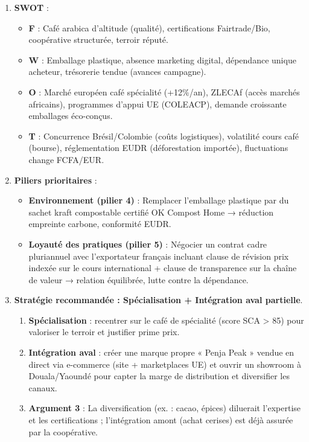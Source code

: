 \documentclass[11pt]{article}
\begin{document}
\begin{corrige}
\begin{enumerate}
    \item \textbf{SWOT} :
    \begin{itemize}
        \item \textbf{F} : Café arabica d'altitude (qualité), certifications Fairtrade/Bio, coopérative structurée, terroir réputé.
        \item \textbf{W} : Emballage plastique, absence marketing digital, dépendance unique acheteur, trésorerie tendue (avances campagne).
        \item \textbf{O} : Marché européen café spécialité (+12\%/an), ZLECAf (accès marchés africains), programmes d'appui UE (COLEACP), demande croissante emballages éco-conçus.
        \item \textbf{T} : Concurrence Brésil/Colombie (coûts logistiques), volatilité cours café (bourse), réglementation EUDR (déforestation importée), fluctuations change FCFA/EUR.
    \end{itemize}
    \item \textbf{Piliers prioritaires} :
    \begin{itemize}
        \item \textbf{Environnement (pilier 4)} : Remplacer l'emballage plastique par du sachet kraft compostable certifié OK Compost Home → réduction empreinte carbone, conformité EUDR.
        \item \textbf{Loyauté des pratiques (pilier 5)} : Négocier un contrat cadre pluriannuel avec l'exportateur français incluant clause de révision prix indexée sur le cours international + clause de transparence sur la chaîne de valeur → relation équilibrée, lutte contre la dépendance.
    \end{itemize}
    \item \textbf{Stratégie recommandée : Spécialisation + Intégration aval partielle}.
    \begin{enumerate}
        \item \textbf{Spécialisation} : recentrer sur le café de spécialité (score SCA > 85) pour valoriser le terroir et justifier prime prix.
        \item \textbf{Intégration aval} : créer une marque propre « Penja Peak » vendue en direct via e-commerce (site + marketplaces UE) et ouvrir un showroom à Douala/Yaoundé pour capter la marge de distribution et diversifier les canaux.
        \item \textbf{Argument 3} : La diversification (ex. : cacao, épices) diluerait l'expertise et les certifications ; l'intégration amont (achat cerises) est déjà assurée par la coopérative.
    \end{enumerate}
\end{enumerate}
\end{corrige}
\end{document}
